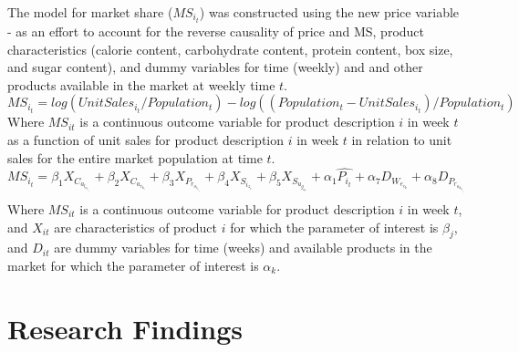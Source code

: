 \documentclass[12pt,english]{article}
\begin{document}
 

\tab The model for market share ($MS_i_t$) was constructed using the new price variable - as an effort to account for the reverse causality of price and MS, product characteristics (calorie content, carbohydrate content, protein content, box size, and sugar content), and dummy variables for time (weekly) and and other products available in the market at weekly time $t$.
\begin{equation}

MS_i_t=log(Unit Sales_i_t/Population_t) - log((Population_t - Unit Sales_i_t)/Population_t)

\end{equation}
Where $MS_{it}$ is a continuous outcome variable for product description $i$ in week $t$ as a function of unit sales for 
product description $i$ in week $t$ in relation to unit sales for the entire market population at time $t$.
\begin{equation}

MS_i_t=\beta_1X_C_a_l_o_r_i_e_s + \beta_2X_C_a_r_b_s + \beta_3X_P_r_o_t_e_i_n +
\beta_4X_S_i_z_e + \beta_5X_S_u_g_a_r + \alpha_1\widehat{P_i_t} +
\alpha_7D_W_e_e_k +
\alpha_8D_P_r_o_d_u_c_t_D_e_s_c_r_i_p_t_i_o_n

\end{equation}
Where $MS_{it}$ is a continuous outcome variable for product description $i$ in week $t$, and $X_{it}$ are characteristics of product $i$ for which the parameter of interest is $\beta_{j}$, and $D_{it}$ are dummy variables for time (weeks) and available products in the market for which the parameter of interest is $\alpha_{k}$.

\section{Research Findings}
\end{document}

